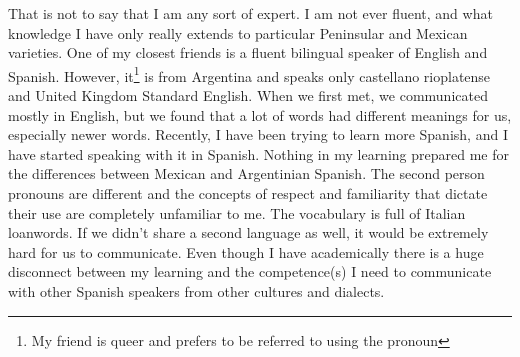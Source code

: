 \documentclass[doc,12pt]{apa6}
\begin{document}
That is not to say that I am any sort of expert. I am not ever fluent, and what
knowledge I have only really extends to particular Peninsular and Mexican
varieties. One of my closest friends is a fluent bilingual speaker of English
and Spanish. However, it\footnote{My friend is queer and prefers to be referred
to using the pronoun } is from Argentina and speaks only castellano
rioplatense and United Kingdom Standard English. When we first met, we
communicated mostly in English, but we found that a lot of words had different
meanings for us, especially newer words. Recently, I have been trying to learn
more Spanish, and I have started speaking with it in Spanish.  Nothing in my
learning prepared me for the differences between Mexican and Argentinian
Spanish. The second person pronouns are different and the concepts of respect
and familiarity that dictate their use are completely unfamiliar to me. The
vocabulary is full of Italian loanwords. If we didn't share a second language
as well, it would be extremely hard for us to communicate. Even though I have
academically  there is a huge disconnect between my
learning and the competence(s) I need to communicate with other Spanish
speakers from other cultures and dialects.
\end{document}
